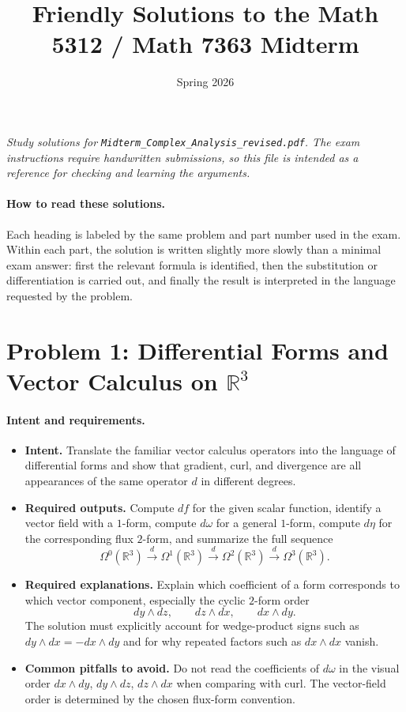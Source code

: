 \documentclass[11pt]{article}
\title{Friendly Solutions to the Math 5312 / Math 7363 Midterm}
\author{}
\date{Spring 2026}
\newenvironment{intentrequirements}{%
\paragraph{Intent and requirements.}
\begin{itemize}[leftmargin=*, itemsep=0.25em]
}{%
\end{itemize}
}
\newcommand{\R}{\mathbb{R}}
\newcommand{\Om}{\Omega}
\begin{document}
\maketitle

\begin{center}
\emph{Study solutions for \texttt{Midterm\_Complex\_Analysis\_revised.pdf}. The exam instructions require handwritten submissions, so this file is intended as a reference for checking and learning the arguments.}
\end{center}

\paragraph{How to read these solutions.}
Each heading is labeled by the same problem and part number used in the exam. Within each part, the solution is written slightly more slowly than a minimal exam answer: first the relevant formula is identified, then the substitution or differentiation is carried out, and finally the result is interpreted in the language requested by the problem.

\section*{Problem 1: Differential Forms and Vector Calculus on $\R^3$}

\begin{intentrequirements}
\item \textbf{Intent.} Translate the familiar vector calculus operators into the language of differential forms and show that gradient, curl, and divergence are all appearances of the same operator $d$ in different degrees.
\item \textbf{Required outputs.} Compute $df$ for the given scalar function, identify a vector field with a $1$-form, compute $d\omega$ for a general $1$-form, compute $d\eta$ for the corresponding flux $2$-form, and summarize the full sequence
\[
 \Om^0(\R^3)\xrightarrow{d}\Om^1(\R^3)\xrightarrow{d}\Om^2(\R^3)\xrightarrow{d}\Om^3(\R^3).
\]
\item \textbf{Required explanations.} Explain which coefficient of a form corresponds to which vector component, especially the cyclic $2$-form order
\[
 dy\wedge dz,\qquad dz\wedge dx,\qquad dx\wedge dy.
\]
The solution must explicitly account for wedge-product signs such as $dy\wedge dx=-dx\wedge dy$ and for why repeated factors such as $dx\wedge dx$ vanish.
\item \textbf{Common pitfalls to avoid.} Do not read the coefficients of $d\omega$ in the visual order $dx\wedge dy$, $dy\wedge dz$, $dz\wedge dx$ when comparing with curl. The vector-field order is determined by the chosen flux-form convention.
\end{intentrequirements}
\end{document}
